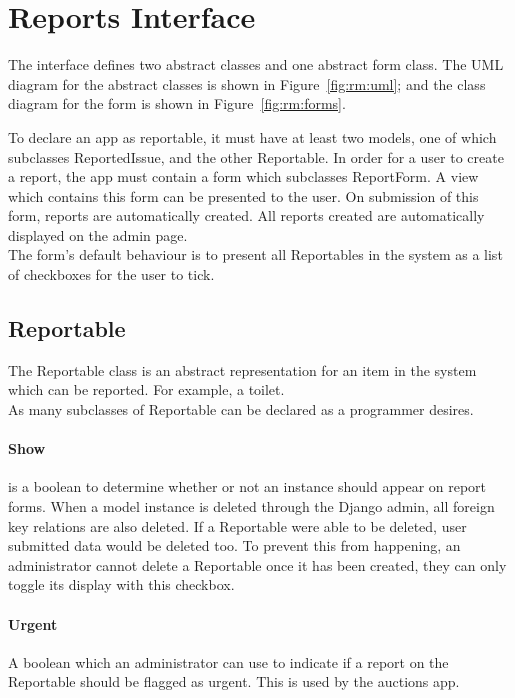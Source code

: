 \FloatBarrier
\section{Reports Interface}
The interface defines two abstract classes and one abstract form class. The UML diagram for the abstract classes is shown in Figure~\ref{fig:rm:uml}; and the class diagram for the form is shown in Figure~\ref{fig:rm:forms}.

To declare an app as reportable, it must have at least two models, one of which subclasses ReportedIssue, and the other Reportable. In order for a user to create a report, the app must contain a form which subclasses ReportForm. A view which contains this form can be presented to the user. On submission of this form, reports are automatically created. All reports created are automatically displayed on the admin page. \\

The form's default behaviour is to present all Reportables in the system as a list of checkboxes for the user to tick.

\subsection{Reportable}
The Reportable class is an abstract representation for an item in the system which can be reported. For example, a toilet. \\

As many subclasses of Reportable can be declared as a programmer desires.

\paragraph{Show} is a boolean to determine whether or not an instance should appear on report forms. When a model instance is deleted through the Django admin, all foreign key relations are also deleted. If a Reportable were able to be deleted, user submitted data would be deleted too. To prevent this from happening, an administrator cannot delete a Reportable once it has been created, they can only toggle its display with this checkbox.

\paragraph{Urgent} A boolean which an administrator can use to indicate if a report on the Reportable should be flagged as urgent. This is used by the auctions app.

